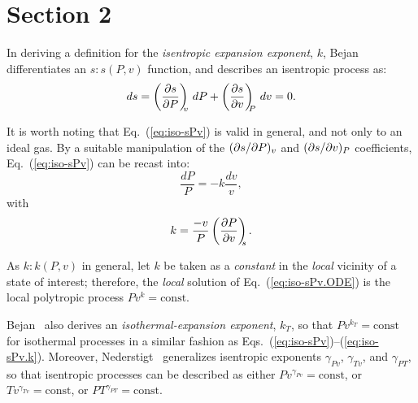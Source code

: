 \section{Section 2}

    In  deriving   a   definition   for   the   \emph{isentropic   expansion   exponent},   $k$,
    Bejan~\cite{2006-BejanA-Wiley} differentiates an $s:s(P,  v)$  function,  and  describes  an
    isentropic process as:
    \begin{equation}
        ds = \left(\frac{\partial {{s}}}{\partial {{P}}}\right)_{\!\!\!{v}}\,dP + \left(\frac{\partial {{s}}}{\partial {{v}}}\right)_{\!\!\!{P}}\,dv = 0.
        \label{eq:iso-sPv}
    \end{equation}

    It is worth noting that Eq.~(\ref{eq:iso-sPv}) is valid in general, and not only to an ideal
    gas. By a suitable manipulation  of  the  $({\partial {{s}}}/{\partial {{P}}})_{{v}}$  and  $({\partial {{s}}}/{\partial {{v}}})_{{P}}$  coefficients,
    Eq.~(\ref{eq:iso-sPv}) can be recast into:
    \begin{equation}
        \frac{dP}{P} = -k\frac{dv}{v},
        \label{eq:iso-sPv.ODE}
    \end{equation}
    \noindent with
    \begin{equation}
        k = \frac{-v}{P}\left(\frac{\partial {{P}}}{\partial {{v}}}\right)_{\!\!\!{s}}.
        \label{eq:iso-sPv.k}
    \end{equation}

    As $k:k(P, v)$ in general, let $k$  be  taken  as  a  \emph{constant}  in  the  \emph{local}
    vicinity   of   a   state   of   interest;   therefore,   the   \emph{local}   solution   of
    Eq.~(\ref{eq:iso-sPv.ODE}) is the local polytropic process $Pv^k = \mbox{const}$.

    Bejan~\cite{2006-BejanA-Wiley} also derives an \emph{isothermal-expansion exponent},  $k_T$,
    so that $Pv^{k_T}  =  \mbox{const}$  for  isothermal  processes  in  a  similar  fashion  as
    Eqs.~(\ref{eq:iso-sPv})--(\ref{eq:iso-sPv.k}).                                     Moreover,
    Nederstigt~\cite{2017-NederstigtP-TUDelft} generalizes isentropic  exponents  $\gamma_{Pv}$,
    $\gamma_{Tv}$, and $\gamma_{PT}$, so that isentropic processes can be  described  as  either
    $Pv^{\gamma_{Pv}}   =   \mbox{const}$,   or   $Tv^{\gamma_{Tv}}    =    \mbox{const}$,    or
    $PT^{\gamma_{PT}} = \mbox{const}$.


